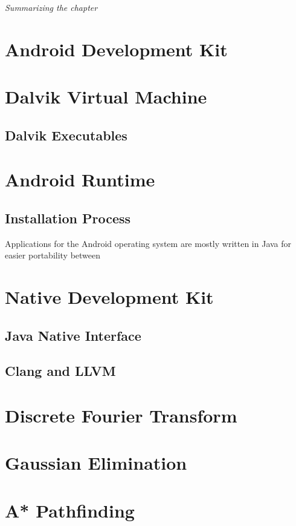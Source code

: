 \textit{Summarizing the chapter}

\section{Android Development Kit}

\section{Dalvik Virtual Machine}


\subsection{Dalvik Executables}



\section{Android Runtime}



\subsection{Installation Process}


Applications for the Android operating system are mostly written in Java for easier portability between \cite[p.~33]{nolan2012decompiling}

\section{Native Development Kit}

\subsection{Java Native Interface}
\subsection{Clang and LLVM}

\section{Discrete Fourier Transform}

\section{Gaussian Elimination}

\section{A* Pathfinding}
